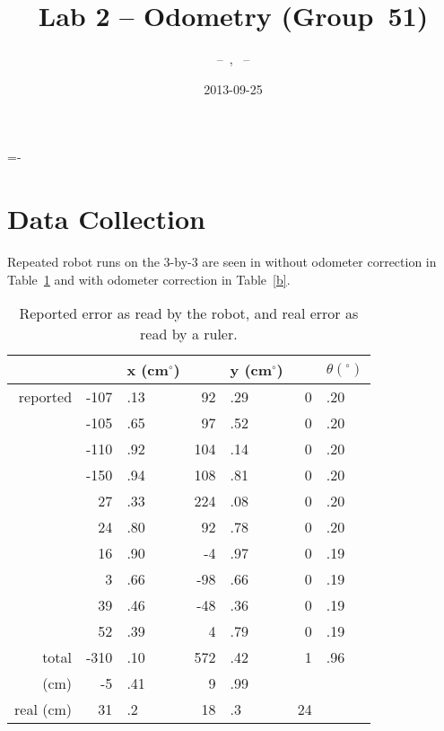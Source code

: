 \documentclass[twocolumn]{article}
\author{\bname~--~\bid, \name~--~\id}
\title{Lab 2 -- Odometry (Group~51)}
\date{2013-09-25}
\def\degree{\ensuremath{^\circ}}
\begin{document}
\abovedisplayskip=-\baselineskip

\maketitle



\section{Data Collection}

Repeated robot runs on the 3-by-3 are seen in without odometer correction in Table~\ref{a} and with odometer correction in Table~\ref{b}.

\begin{table}[htb]
\begin{center}\begin{tabular}{r r@{}l r@{}l r@{}l}
& &x (cm\degree)& &y (cm\degree)& &$\theta (\degree)$ \\
\hline
reported&-107&.13&	92&.29&	0&.20 \\
&-105&.65&	97&.52&	0&.20 \\
&-110&.92&	104&.14&	0&.20 \\
&-150&.94&	108&.81&	0&.20 \\
&27&.33&	224&.08&	0&.20 \\
&24&.80&	92&.78&	0&.20 \\
&16&.90&	-4&.97&	0&.19 \\
&3&.66&	-98&.66&	0&.19 \\
&39&.46&	-48&.36&	0&.19 \\
&52&.39&	4&.79&	0&.19 \\
\hline
total&	-310&.10&	572&.42&	1&.96 \\
(cm)&	-5&.41& 9&.99\\
real (cm)&	31&.2&	18&.3&	24
\end{tabular}\end{center}
\caption{Reported error as read by the robot, and real error as read by a ruler.}
\label{a}
\end{table}
\end{document}
